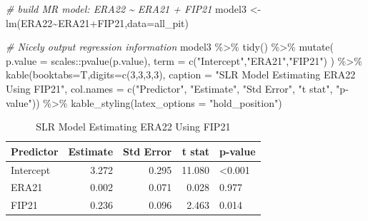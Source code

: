 \documentclass[
  11pt,
]{book}
\newenvironment{Shaded}{\begin{snugshade}}{\end{snugshade}}
\newcommand{\AttributeTok}[1]{\textcolor[rgb]{0.77,0.63,0.00}{#1}}
\newcommand{\CommentTok}[1]{\textcolor[rgb]{0.56,0.35,0.01}{\textit{#1}}}
\newcommand{\DecValTok}[1]{\textcolor[rgb]{0.00,0.00,0.81}{#1}}
\newcommand{\FunctionTok}[1]{\textcolor[rgb]{0.00,0.00,0.00}{#1}}
\newcommand{\NormalTok}[1]{#1}
\newcommand{\OtherTok}[1]{\textcolor[rgb]{0.56,0.35,0.01}{#1}}
\newcommand{\SpecialCharTok}[1]{\textcolor[rgb]{0.00,0.00,0.00}{#1}}
\newcommand{\StringTok}[1]{\textcolor[rgb]{0.31,0.60,0.02}{#1}}
\theoremstyle{definition}
\theoremstyle{definition}
\theoremstyle{definition}
\theoremstyle{definition}
\theoremstyle{remark}
\begin{document}
\begin{Shaded}
\begin{Highlighting}[]
\CommentTok{\# build MR model: ERA22 \textasciitilde{} ERA21 + FIP21}
\NormalTok{model3 }\OtherTok{\textless{}{-}} \FunctionTok{lm}\NormalTok{(ERA22}\SpecialCharTok{\textasciitilde{}}\NormalTok{ERA21}\SpecialCharTok{+}\NormalTok{FIP21,}\AttributeTok{data=}\NormalTok{all\_pit)}

\CommentTok{\# Nicely output regression information}
\NormalTok{model3 }\SpecialCharTok{\%\textgreater{}\%} \FunctionTok{tidy}\NormalTok{() }\SpecialCharTok{\%\textgreater{}\%}
  \FunctionTok{mutate}\NormalTok{(}
    \AttributeTok{p.value =}\NormalTok{ scales}\SpecialCharTok{::}\FunctionTok{pvalue}\NormalTok{(p.value),}
    \AttributeTok{term =} \FunctionTok{c}\NormalTok{(}\StringTok{"Intercept"}\NormalTok{,}\StringTok{"ERA21"}\NormalTok{,}\StringTok{"FIP21"}\NormalTok{)}
\NormalTok{  ) }\SpecialCharTok{\%\textgreater{}\%}
  \FunctionTok{kable}\NormalTok{(}\AttributeTok{booktabs=}\NormalTok{T,}\AttributeTok{digits=}\FunctionTok{c}\NormalTok{(}\DecValTok{3}\NormalTok{,}\DecValTok{3}\NormalTok{,}\DecValTok{3}\NormalTok{,}\DecValTok{3}\NormalTok{), }
        \AttributeTok{caption =} \StringTok{"SLR Model Estimating ERA22 Using FIP21"}\NormalTok{,}
        \AttributeTok{col.names =} \FunctionTok{c}\NormalTok{(}\StringTok{"Predictor"}\NormalTok{, }\StringTok{"Estimate"}\NormalTok{, }\StringTok{"Std Error"}\NormalTok{, }\StringTok{"t stat"}\NormalTok{, }\StringTok{"p{-}value"}\NormalTok{)) }\SpecialCharTok{\%\textgreater{}\%}
  \FunctionTok{kable\_styling}\NormalTok{(}\AttributeTok{latex\_options =} \StringTok{"hold\_position"}\NormalTok{)}
\end{Highlighting}
\end{Shaded}

\begin{table}[!h]

\caption{\label{tab:unnamed-chunk-222}SLR Model Estimating ERA22 Using FIP21}
\centering
\begin{tabular}[t]{lrrrl}
\toprule
Predictor & Estimate & Std Error & t stat & p-value\\
\midrule
Intercept & 3.272 & 0.295 & 11.080 & <0.001\\
ERA21 & 0.002 & 0.071 & 0.028 & 0.977\\
FIP21 & 0.236 & 0.096 & 2.463 & 0.014\\
\bottomrule
\end{tabular}
\end{table}
\end{document}
